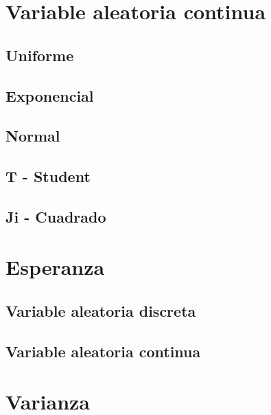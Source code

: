 \documentclass[
]{book}
\begin{document}
\hypertarget{variable-aleatoria-continua}{%
\section{Variable aleatoria continua}\label{variable-aleatoria-continua}}

\hypertarget{uniforme-1}{%
\subsection{Uniforme}\label{uniforme-1}}

\hypertarget{exponencial}{%
\subsection{Exponencial}\label{exponencial}}

\hypertarget{normal}{%
\subsection{Normal}\label{normal}}

\hypertarget{t---student}{%
\subsection{T - Student}\label{t---student}}

\hypertarget{ji---cuadrado}{%
\subsection{Ji - Cuadrado}\label{ji---cuadrado}}

\hypertarget{esperanza}{%
\section{Esperanza}\label{esperanza}}

\hypertarget{variable-aleatoria-discreta-1}{%
\subsection{Variable aleatoria discreta}\label{variable-aleatoria-discreta-1}}

\hypertarget{variable-aleatoria-continua-1}{%
\subsection{Variable aleatoria continua}\label{variable-aleatoria-continua-1}}

\hypertarget{varianza}{%
\section{Varianza}\label{varianza}}
\end{document}
